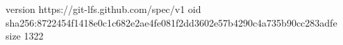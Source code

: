 version https://git-lfs.github.com/spec/v1
oid sha256:8722454f1418e0c1c682e2ae4fe081f2dd3602e57b4290c4a735b90cc283adfe
size 1322
